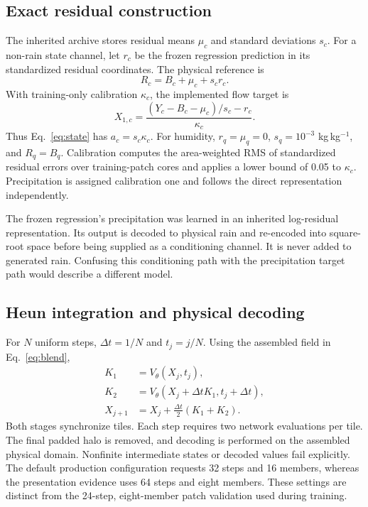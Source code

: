 \documentclass[10pt]{article}
\begin{document}
\subsection{Exact residual construction}
The inherited archive stores residual means $\mu_c$ and standard deviations $s_c$. For a non-rain state channel, let $r_c$ be the frozen regression prediction in its standardized residual coordinates. The physical reference is
\begin{equation}
R_c=B_c+\mu_c+s_cr_c.
\end{equation}
With training-only calibration $\kappa_c$, the implemented flow target is
\begin{equation}
X_{1,c}=\frac{(Y_c-B_c-\mu_c)/s_c-r_c}{\kappa_c}.
\end{equation}
Thus Eq.~\eqref{eq:state} has $a_c=s_c\kappa_c$. For humidity, $r_q=\mu_q=0$, $s_q=10^{-3}$ kg\,kg$^{-1}$, and $R_q=B_q$. Calibration computes the area-weighted RMS of standardized residual errors over training-patch cores and applies a lower bound of 0.05 to $\kappa_c$. Precipitation is assigned calibration one and follows the direct representation independently.

The frozen regression's precipitation was learned in an inherited log-residual representation. Its output is decoded to physical rain and re-encoded into square-root space before being supplied as a conditioning channel. It is never added to generated rain. Confusing this conditioning path with the precipitation target path would describe a different model.

\subsection{Heun integration and physical decoding}
For $N$ uniform steps, $\Delta t=1/N$ and $t_j=j/N$. Using the assembled field in Eq.~\eqref{eq:blend},
\begin{align}
K_1&=V_\theta(X_j,t_j),\\
K_2&=V_\theta(X_j+\Delta tK_1,t_j+\Delta t),\\
X_{j+1}&=X_j+\tfrac{\Delta t}{2}(K_1+K_2).
\end{align}
Both stages synchronize tiles. Each step requires two network evaluations per tile. The final padded halo is removed, and decoding is performed on the assembled physical domain. Nonfinite intermediate states or decoded values fail explicitly. The default production configuration requests 32 steps and 16 members, whereas the presentation evidence uses 64 steps and eight members. These settings are distinct from the 24-step, eight-member patch validation used during training.
\end{document}
